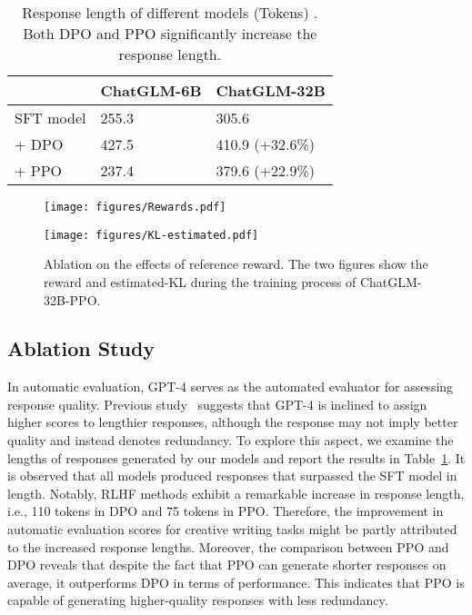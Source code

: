 \begin{table}[]
    \centering
    \caption{Response length of different models (Tokens) . \textmd{Both DPO and PPO significantly increase the response length.}}
    \begin{tabular}{lll}
    \toprule[1.2pt]
         & ChatGLM-6B & ChatGLM-32B \\
    \midrule
        SFT model & 255.3 & 305.6 \\
       \qquad  + DPO & 427.5 & 410.9 (+32.6\%) \\
       \qquad  + PPO & 237.4 & 379.6 (+22.9\%) \\
    \bottomrule[1.2pt]
    \end{tabular}
    \vspace{-2mm}
    \label{tab:length}
\end{table}

\begin{figure}[ht]
    \centering
    \begin{minipage}[t]{0.35\textwidth}
        \texttt{[image: figures/Rewards.pdf]}
    \end{minipage}
    \begin{minipage}[t]{0.35\textwidth}
        \texttt{[image: figures/KL-estimated.pdf]}
    \end{minipage}
    \caption{Ablation on the effects of reference reward. \textmd{The two figures show the reward and estimated-KL during the training process of ChatGLM-32B-PPO.}}
    \vspace{-2mm}
    \label{fig:reference_reward}
\end{figure}

\subsection{Ablation Study}

 In automatic evaluation, GPT-4 serves as the automated evaluator for assessing response quality. Previous study~\cite{zheng2023judging} suggests that GPT-4 is inclined to assign higher scores to lengthier responses, although the response may not imply better quality and instead denotes redundancy. To explore this aspect, we examine the lengths of responses generated by our models and report the results in Table~\ref{tab:length}. It is observed that all models produced responses that surpassed the SFT model in length. Notably, RLHF methods exhibit a remarkable increase in response length, i.e., 110 tokens in DPO and 75 tokens in PPO. Therefore, the improvement in automatic evaluation scores for creative writing tasks might be partly attributed to the increased response lengths. Moreover, the comparison between PPO and DPO reveals that despite the fact that PPO can generate shorter responses on average, it outperforms DPO in terms of performance. This indicates that PPO is capable of generating higher-quality responses with less redundancy.

